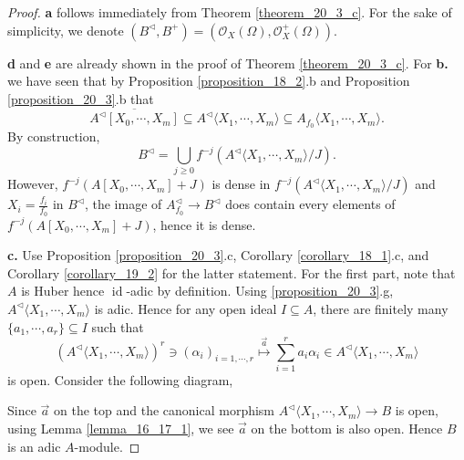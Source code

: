 \documentclass[10pt]{article}
\numberwithin{equation}{section}
\theoremstyle{definition}
\DeclareMathOperator{\id}{id}
\newcommand{\cO}[0]{\mathcal{O}}
\newcommand{\comppol}[1]{\langle X_1,\cdots, X_{#1}\rangle}
\begin{document}
\begin{proof}
    \textbf{a} follows immediately from Theorem \ref{theorem_20_3_c}. For the sake of simplicity, we denote $(B^\triangleleft,B^+)=(\cO_X(\Omega),\cO^+_X(\Omega))$.
    \par\textbf{d} and \textbf{e} are already shown in the proof of Theorem \ref{theorem_20_3_c}. For \textbf{b.} we have seen that by Proposition \ref{proposition_18_2}.b and Proposition \ref{proposition_20_3}.b that
    \begin{equation*}
        \overline{A^\triangleleft[X_0,\cdots,X_m]}\subseteq A^\triangleleft\comppol{m}\subseteq A_{f_0}\comppol{m}.
    \end{equation*}
    By construction,
    \begin{equation*}
        B^\triangleleft = \bigcup_{j\geq0}f^{-j}(A^\triangleleft\comppol{m}/J).
    \end{equation*}
    However, $f^{-j}(A[X_0,\cdots,X_m]+J)$ is dense in $f^{-j}(A^\triangleleft\comppol{m}/J)$ and $X_i = {\frac {f_i} {f_0}}$ in $B^\triangleleft$, the image of $A_{f_0}^\triangleleft \to B^\triangleleft$ does contain every elements of $f^{-j}(A[X_0,\cdots,X_m]+J)$, hence it is dense.
    \par\textbf{c.} Use Proposition \ref{proposition_20_3}.c, Corollary \ref{corollary_18_1}.c, and Corollary \ref{corollary_19_2} for the latter statement. For the first part, note that $A$ is Huber hence $\id$-adic by definition. Using \ref{proposition_20_3}.g, $A^\triangleleft\comppol{m}$ is adic. Hence for any open ideal $I\subseteq A$, there are finitely many $\{a_1,\cdots,a_r\}\subseteq I$ such that
    \begin{equation*}
        (A^\triangleleft\comppol{m})^r\ni(\alpha_i)_{i=1,\cdots,r}\stackrel{\vec{a}}{\mapsto} \sum_{i=1}^r a_i\alpha_i\in A^\triangleleft\comppol{m}
    \end{equation*}
    is open. Consider the following diagram,
    \begin{center}
    \end{center}
    Since $\vec{a}$ on the top and the canonical morphism $A^\triangleleft\comppol{m}\to B$ is open, using Lemma \ref{lemma_16_17_1}, we see $\vec{a}$ on the bottom is also open. Hence $B$ is an adic $A$-module.
\end{proof}
\end{document}
